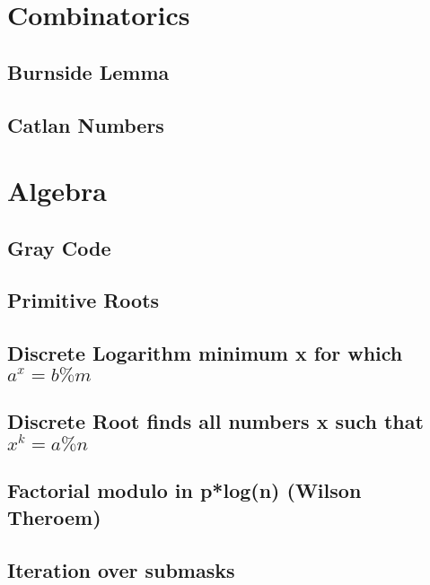 \section{Combinatorics}
\subsection{Burnside Lemma}
\raggedbottom
\hrulefill
\subsection{Catlan Numbers}
\raggedbottom
\hrulefill

\section{Algebra}
\subsection{Gray Code}
\raggedbottom
\hrulefill
\subsection{Primitive Roots}
\raggedbottom
\hrulefill
\subsection{Discrete Logarithm minimum x for which ${a^x = b \% m}$}
\raggedbottom
\hrulefill
\subsection{Discrete Root finds all numbers x such that ${x^k = a \% n}$}
\raggedbottom
\hrulefill
\subsection{Factorial modulo in p*log(n) (Wilson Theroem)}
\raggedbottom
\hrulefill
\subsection{Iteration over submasks}
\raggedbottom
\hrulefill
